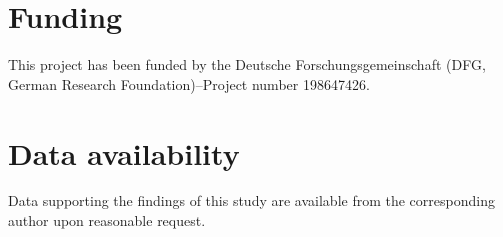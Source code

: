 \documentclass[10pt,a4paper]{article}
\begin{document}
\section*{Funding}

This project has been funded by the Deutsche Forschungsgemeinschaft (DFG, German Research Foundation)--Project number 198647426. 

\section*{Data availability}
Data supporting the findings of this study are available from the corresponding author upon reasonable request.


\setlength{\bibleftmargin}{.125in}
\setlength{\bibindent}{-\bibleftmargin}


\end{document}
